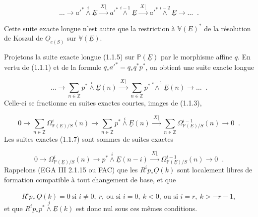 \begin{equation}\tag{1.1.5}
\ldots \longrightarrow {a'}^{*} \overset{i}{\wedge} \underline{E} \xrightarrow{\;X\lfloor\;} {a'}^{*} \overset{i-1}{\wedge} \underline{E} \xrightarrow{\;X\lfloor\;} {a'}^{*} \overset{i-2}{\wedge} \underline{E} \longrightarrow \ldots \;\; .
\end{equation}


Cette suite exacte longue n'est autre que la restriction à $\mathbb{V}(\underline{E})^*$ de la résolution de Koszul de $\underline{O}_{e(S)}$ sur $\mathbb{V}(\underline{E})$.

Projetons la suite exacte longue (1.1.5) sur $\mathbb{P}(\underline{E})$ par le morphisme affine $q$. En vertu de (1.1.1) et de la formule $q_*{a'}^{*} = q_*q^*p^*$, on obtient une suite exacte longue

\begin{equation}\tag{1.1.6}
\ldots \longrightarrow \sum_{n \in \mathbb{Z}} p^* \overset{i}{\wedge} \underline{E}(n) \xrightarrow{\;X\lfloor\;} \sum_{n \in \mathbb{Z}} p^* \overset{i-1}{\wedge} \underline{E}(n) \longrightarrow \ldots \;\; .
\end{equation}
Celle-ci se fractionne en suites exactes courtes, images de (1.1.3),

\begin{equation}\tag{1.1.7}
0 \longrightarrow \sum_{n \in \mathbb{Z}} \Omega^i_{\mathbb{P}(\underline{E})/S}(n) \longrightarrow \sum_{n \in \mathbb{Z}} p^* \overset{i}{\wedge} \underline{E}(n) \xrightarrow{\;X\lfloor\;} \sum_{n \in \mathbb{Z}} \Omega^{i-1}_{\mathbb{P}(\underline{E})/S}(n) \to 0 \;\; .
\end{equation}
Les suites exactes (1.1.7) sont sommes de suites exactes

\begin{equation}\tag{1.1.8}
0 \longrightarrow \Omega^i_{\mathbb{P}(\underline{E})/S}(n) \longrightarrow p^* \overset{i}{\wedge} \underline{E}(n-i) \xrightarrow{\;X\lfloor\;} \Omega^{i-1}_{\mathbb{P}(\underline{E})/S}(n) \longrightarrow 0 \;\; .
\end{equation}
Rappelons (EGA III 2.1.15 ou FAC) que les $R^i p_* \underline{O}(k)$ sont localement libres de formation compatible à tout changement de base, et que

\begin{equation}\tag{1.1.9}
R^i p_* \, \underline{O}(k) = 0 \ \text{si } i \neq 0,\ r, \ \text{ou si } i = 0,\ k < 0, \ \text{ou si } i = r,\ k > -r-1,
\end{equation}
et que $R^i p_* p^* \overset{j}{\wedge} \underline{E}(k)$ est donc nul sous ces mêmes conditions.

